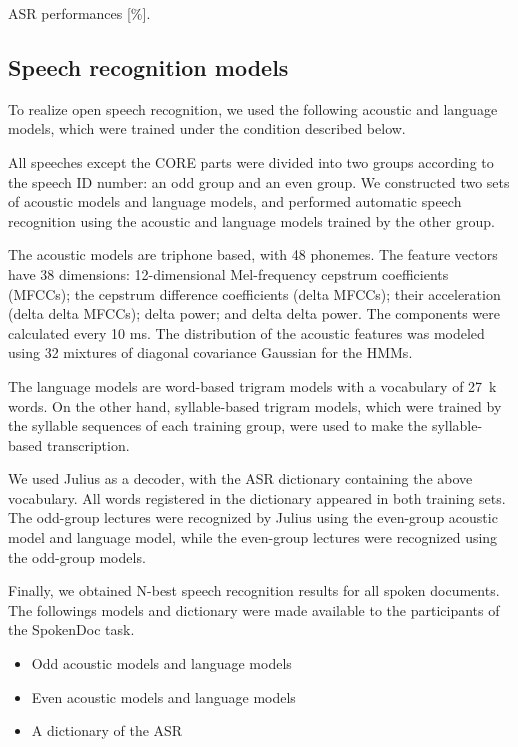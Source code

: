 \documentclass[english]{jnlp_1.4}
\begin{document}
\begin{table}[t]
\caption{ASR performances [\%].}
\label{tbl:asr}

\end{table}



\subsection{Speech recognition models}

To realize open speech recognition, we used the following acoustic and
language models, which were trained under the condition described
below.

All speeches except the CORE parts were divided into two groups according to
the speech ID number: an odd group and an even group. We constructed two sets
of acoustic models and language models, and performed automatic speech
recognition using the acoustic and language models trained by the other
group.

The acoustic models are triphone based, with 48 phonemes.
The feature vectors have 38 dimensions: 12-dimensional Mel-frequency
cepstrum coefficients (MFCCs); the cepstrum difference coefficients
(delta MFCCs); their acceleration (delta delta MFCCs); delta power; and
delta delta power. The components were calculated every 10 ms.
The distribution of the acoustic features was modeled using 32 mixtures
of diagonal covariance Gaussian for the HMMs.

The language models are word-based trigram models with a vocabulary of
27~k words. On the other hand, syllable-based trigram models, which were
trained by the syllable sequences of each training group, were used to
make the syllable-based transcription.

We used Julius \cite{Julius} as a decoder, with the ASR dictionary containing
the above vocabulary. All words registered in the dictionary appeared in
both training sets. The odd-group lectures were recognized by Julius
using the even-group acoustic model and language model, while the
even-group lectures were recognized using the odd-group models.

Finally, we obtained N-best speech recognition results for all spoken
documents. The followings models and dictionary were made available to
the participants of the SpokenDoc task.
\begin{itemize}
\item Odd acoustic models and language models
\item Even acoustic models and language models
\item A dictionary of the ASR
\end{itemize}
\end{document}
